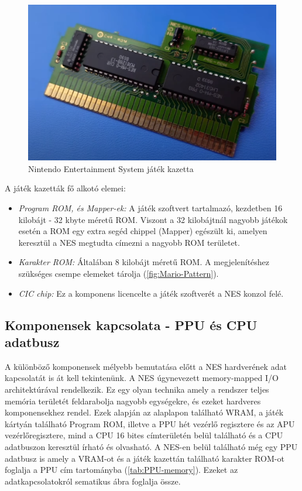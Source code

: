 \begin{figure}[H]
	\centering
	\includegraphics[width=150mm, keepaspectratio]{figures/Mario-Duckhunt-cartage}
	\caption{Nintendo Entertainment System játék kazetta \cite{NES_cartridge}}
	\label{fig:NES-Game-Cartridge}
\end{figure}

A  játék kazetták fő alkotó elemei:

\begin{itemize}
	\item \emph{Program ROM, és Mapper-ek:} A játék szoftvert tartalmazó, kezdetben 16 kilobájt - 32 kbyte méretű ROM. Viszont a 32 kilobájtnál nagyobb játékok esetén a ROM egy extra segéd chippel (Mapper) egészült ki, amelyen keresztül a NES megtudta címezni a nagyobb ROM területet. 
	\item \emph{Karakter ROM:} Általában 8 kilobájt méretű ROM. A megjelenítéshez szükséges csempe elemeket tárolja (\ref{fig:Mario-Pattern}).
	\item \emph{CIC chip:} Ez a komponens licencelte a játék szoftverét a NES konzol felé.
\end{itemize}

	\subsection{Komponensek kapcsolata - PPU és CPU adatbusz}
	\label{sec:NES-connection-components}
	
	A különböző komponensek mélyebb bemutatása előtt a NES hardverének adat kapcsolatát is át kell tekintenünk. A NES úgynevezett memory-mapped I/O architektúrával rendelkezik. Ez egy olyan technika amely a rendszer teljes memória területét feldarabolja nagyobb egységekre, és ezeket hardveres komponensekhez rendel. Ezek alapján az alaplapon található WRAM, a játék kártyán található Program ROM, illetve a PPU hét vezérlő regisztere és az APU vezérlőregisztere, mind a CPU 16 bites címterületén belül található és a CPU adatbuszon keresztül írható és olvasható. A NES-en belül található még egy PPU adatbusz is amely a VRAM-ot és a játék kazettán található karakter ROM-ot foglalja a PPU cím tartományba (\ref{tab:PPU-memory}). Ezeket az adatkapcsolatokról  sematikus ábra foglalja össze.
	
